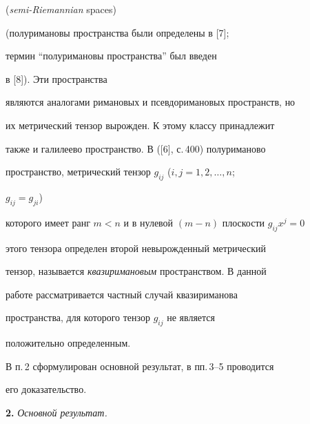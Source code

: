 ({\it semi-Riemannian} spaces)


(полуримановы пространства были определены в [7];


термин ``полуримановы пространства'' был введен


в [8]). Эти пространства


являются аналогами римановых и псевдоримановых пространств, но


их метрический тензор вырожден. К этому классу принадлежит


также и галилеево пространство. В ([6], с.\,400) полуриманово


пространство, метрический тензор $g_{ij}$ ($i,j=1,2,\dotsc,n$; 


$g_{ij}=g_{ji}$)


которого имеет ранг $m<n$ и в нулевой $(m-n)$ плоскости $g_{ij}x^j=0$


этого тензора определен второй невырожденный метрический


тензор, называется {\it квазиримановым} пространством. В данной


работе рассматривается частный случай квазириманова


пространства, для которого тензор $g_{ij}$ не является


положительно определенным.





В п.\,2 сформулирован основной результат, в пп.\,3--5 проводится


его доказательство.


\medskip





{\bf 2.} {\it Основной результат.}





